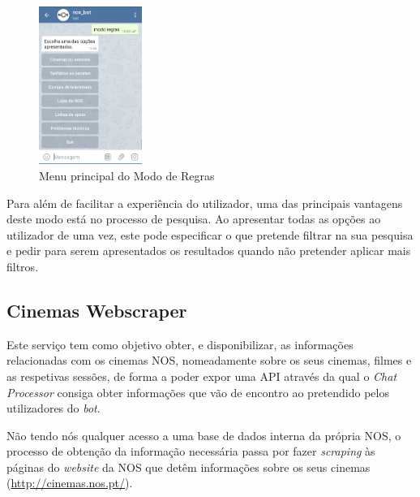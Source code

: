 \documentclass[11pt,a4paper]{article}
\begin{document}
\begin{figure}[H]
\begin{center}
\includegraphics[width=0.30\textwidth]{images/modo_regras.png}
\end{center}
\caption{Menu principal do Modo de Regras}
\label{fig:figModoRegras}
\end{figure}

Para além de facilitar a experiência do utilizador, uma das principais vantagens deste modo está no processo
de pesquisa. Ao apresentar todas as opções ao utilizador de uma vez, este pode especificar o que pretende
filtrar na sua pesquisa e pedir para serem apresentados os resultados quando não pretender aplicar mais
filtros.


\subsection{Cinemas Webscraper}\label{sec:cinemas}

Este serviço tem como objetivo obter, e disponibilizar, as informações relacionadas com os cinemas NOS,
nomeadamente sobre os seus cinemas, filmes e as respetivas sessões, de forma a poder expor uma API
através da qual o \textit{Chat Processor} consiga obter informações que vão de encontro ao pretendido pelos
utilizadores do \textit{bot}.

\vspace{2mm}

Não tendo nós qualquer acesso a uma base de dados interna da própria NOS, o processo de obtenção da informação
necessária passa por fazer \emph{scraping} às páginas do \emph{website} da NOS que detêm informações sobre os
seus cinemas (\url{http://cinemas.nos.pt/}).

\vspace{2mm}
\end{document}
